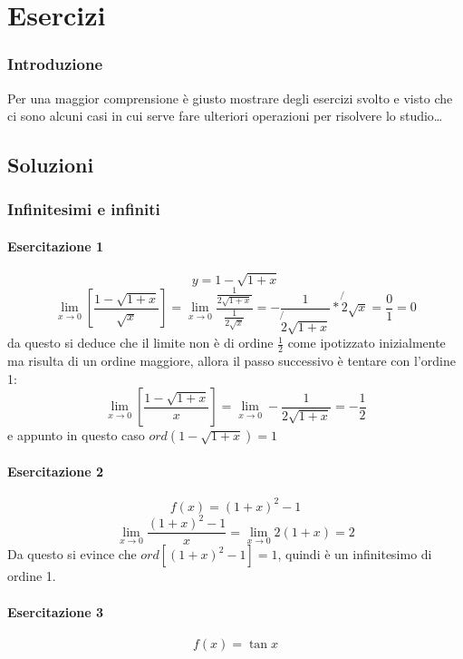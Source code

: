 \part{Esercizi}
\section{Introduzione}
Per una maggior comprensione è giusto mostrare degli esercizi svolto e visto che ci sono alcuni casi in cui serve fare ulteriori operazioni per risolvere lo studio\dots

\chapter{Soluzioni}
\section {Infinitesimi e infiniti}
\subsection{Esercitazione 1}
\begin{equation}
	y=1-\sqrt{1+x}
\end{equation}
\begin{equation*}
	\lim_{x\to0}\left[\frac{1-\sqrt{1+x}}{\sqrt{x}}\right]=\lim_{x\to0}\frac{\frac{1}{2\sqrt{1+x}}}{\frac{1}{2\sqrt{x}}}=-\frac{1}{\not{2}\sqrt{1+x}}*\not{2}\sqrt{x}=\frac{0}{1}=0
\end{equation*}
da questo si deduce che il limite non è di ordine $\frac{1}{2}$ come ipotizzato inizialmente ma risulta di un ordine maggiore, allora il passo successivo è tentare con l'ordine 1:
\begin{equation*}
	\lim_{x\to0}\left[\frac{1-\sqrt{1+x}}{x}\right]=\lim_{x\to0}-\frac{1}{2\sqrt{1+x}}=-\frac{1}{2}
\end{equation*}
e appunto in questo caso $ord\left(1-\sqrt{1+x}\right)=1$
\subsection{Esercitazione 2}
\begin{equation}
	f(x)=(1+x)^2-1
\end{equation}
\begin{equation*}
	\lim_{x\to0}\frac{(1+x)^2-1}{x}=\lim_{x\to0}2(1+x)=2
\end{equation*}
Da questo si evince che $ord\left[(1+x)^2-1\right]=1$, quindi è un infinitesimo di ordine 1.
\subsection{Esercitazione 3}
\begin{equation}
	f(x)=\tan x
\end{equation}
